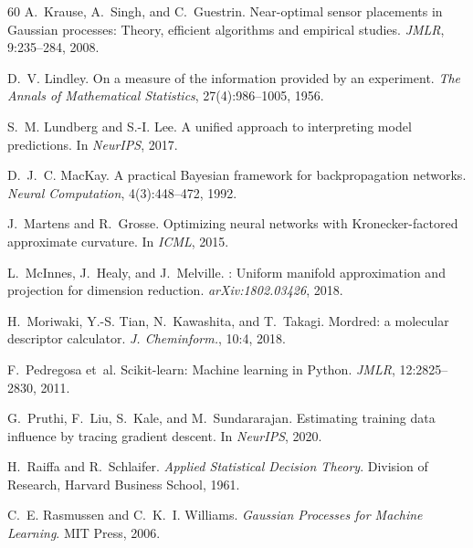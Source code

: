 \documentclass[10pt,twocolumn,letterpaper]{article}
\theoremstyle{definition}
\begin{document}
\begin{thebibliography}{60}
A.~Krause, A.~Singh, and C.~Guestrin.
\newblock Near-optimal sensor placements in {G}aussian processes: Theory, efficient algorithms and empirical studies.
\newblock \emph{JMLR}, 9:235--284, 2008.

D.~V. Lindley.
\newblock On a measure of the information provided by an experiment.
\newblock \emph{The Annals of Mathematical Statistics}, 27(4):986--1005, 1956.

S.~M. Lundberg and S.-I. Lee.
\newblock A unified approach to interpreting model predictions.
\newblock In \emph{NeurIPS}, 2017.

D.~J.~C. MacKay.
\newblock A practical {B}ayesian framework for backpropagation networks.
\newblock \emph{Neural Computation}, 4(3):448--472, 1992.

J.~Martens and R.~Grosse.
\newblock Optimizing neural networks with {K}ronecker-factored approximate curvature.
\newblock In \emph{ICML}, 2015.

L.~McInnes, J.~Healy, and J.~Melville.
: Uniform manifold approximation and projection for dimension reduction.
\newblock \emph{arXiv:1802.03426}, 2018.

H.~Moriwaki, Y.-S. Tian, N.~Kawashita, and T.~Takagi.
\newblock Mordred: a molecular descriptor calculator.
\newblock \emph{J. Cheminform.}, 10:4, 2018.

F.~Pedregosa et~al.
\newblock Scikit-learn: Machine learning in {P}ython.
\newblock \emph{JMLR}, 12:2825--2830, 2011.

G.~Pruthi, F.~Liu, S.~Kale, and M.~Sundararajan.
\newblock Estimating training data influence by tracing gradient descent.
\newblock In \emph{NeurIPS}, 2020.

H.~Raiffa and R.~Schlaifer.
\newblock \emph{Applied Statistical Decision Theory}.
\newblock Division of Research, Harvard Business School, 1961.

C.~E. Rasmussen and C.~K.~I. Williams.
\newblock \emph{Gaussian Processes for Machine Learning}.
\newblock MIT Press, 2006.


\end{thebibliography}
\end{document}
